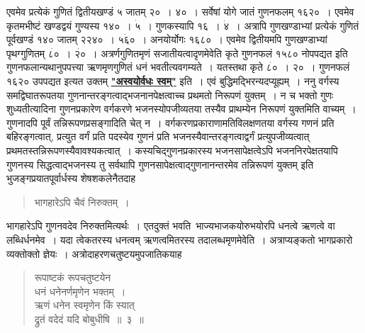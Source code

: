 \documentclass[11pt, openany]{book}
\begin{document}
\vspace{-3mm}
 एवमेव प्रत्येकं गुणितं द्वितीयखण्डं ५ जातम् २०~। ४०~। सर्वेषां 
योगे जातं गुणनफलम् १६२०~। एवमेव कृतमभीष्टं खण्डद्वयं गुण्यस्य 
१४०~। $\dot{\text{५}}$~। गुणकस्यापि १६~। $\dot{\text{४}}$~। अत्रापि गुणखण्डाभ्यां प्रत्येकं गुणितं पूर्वखण्डं १४० जातम् २२४०~। $\dot{\text{५६०}}$~। अनयोर्योगः १६८०~। एवमेव 
द्वितीयमपि गुणखण्डाभ्यां पृथग्गुणितम् $\dot{\text{८०}}$~। $\dot{\text{२०}}$~। अत्रर्णगुणितमृणं सजातीयत्वादृणमेवेति कृते गुणनफलं १५८० नोपपद्यत इति गुणनफलान्यथानुपपत्त्या ऋणमृणगुणितं धनं भवतीत्यवगम्यते~। यतस्तथा कृते $\dot{\text{८०}}$~। २०~। गुणनफलं १६२० उपपद्यत इत्यत उक्तम् \hyperref[1.4.1]{\textbf{"अस्वयोर्वधः स्वम्"}} इति~। एवं बुद्धिमद्भिरन्यदप्यूह्यम्~। ननु वर्गस्य समद्विघातरूपतया
गुणनान्तरङ्गत्वाद्भजनानपेक्षत्वाच्च प्रथमतो निरूपणं युक्तम्~। न च भक्तो
गुणः शुध्यतीत्यादिना गुणनप्रकारेण वर्गकरणे भजनस्योपजीव्यतया तस्यैव
प्राथम्येन निरूपणं युक्तमिति वाच्यम्~। गुणनादपि पूर्वं तन्निरूपणप्रसङ्गादिति चेत्
न~। वर्गकरणप्रकाराणामतिविलक्षणतया वर्गस्य गणनं प्रति बहिरङ्गत्वात्, 
प्रत्युत वर्गं प्रति पदस्येव गुणनं प्रति भजनस्यैवान्तरङ्गत्वाद्वर्गं प्रत्युपजीव्यत्वात् प्रथमतस्तन्निरूपणस्यैवावश्यकत्वात्~। कस्यचिद्गुणनप्रकारस्य भजनसापेक्षत्वेऽपि भजननिरपेक्षतयापि गुणनस्य सिद्धत्वाद्भजनस्य तु सर्वथापि गुणनसापेक्षत्वाद्गुणनानन्तरमेव तन्निरूपणं युक्तम् इति भुजङ्गप्रयातपूर्वार्धस्य शेषशकलेनैतदाह\textendash  

\newpage
 \label{1.4.2}
\begin{quote}
    \bs भागहारेऽपि चैवं निरुक्तम्~। 
\end{quote}
 
 भागहारेऽपि गुणनवदेव निरुक्तमित्यर्थः~। एतदुक्तं
भवति\textendash~भाज्यभाजकयोरुभयोरपि धनत्वे ऋणत्वे वा लब्धिर्धनमेव~। यदा त्वेकतरस्य धनत्वम् ऋणत्वमितरस्य तदालब्धमृणमेवेति~। अत्राप्यङ्कतो भागप्रकारो व्यक्तोक्तो ज्ञेयः~। अत्रोदाहरणचतुष्टयमुपजातिकयाह\textendash

\begin{quote}
    \ex
 रूपाष्टकं रूपचतुष्टयेन \\

\vspace{-7mm}
\hspace{1cm} धनं धनेनर्णमृणेन भक्तम्~। \\

 \vspace{-7mm}
 ऋणं धनेन स्वमृणेन किं स्यात् \\

\vspace{-7mm}
\hspace{1cm} द्रुतं वदेदं यदि बोबुधीषि~॥~३~॥
\end{quote}
\end{document}
